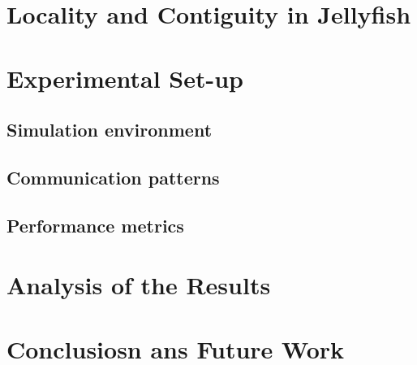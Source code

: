 \documentclass{sig-alternate}
\begin{document}
\section{Locality and Contiguity in Jellyfish}
\label{locality}

\section{Experimental Set-up}
\label{experimental}

\subsection{Simulation environment}
\label{subsec:simulation}


\subsection{Communication patterns}
\label{subsec:communication}

\subsection{Performance metrics}
\label{subsec:performance}


\section{Analysis of the Results}
\label{analysis}

\section{Conclusiosn ans Future Work}
\label{conclusions}




\end{document}
